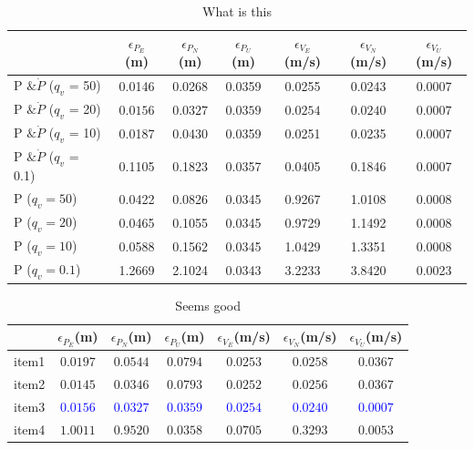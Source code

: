 \documentclass[paper=a4, fontsize=11pt]{scrartcl} %
\numberwithin{equation}{section} %
\numberwithin{figure}{section} %
\numberwithin{table}{section} %
\begin{document}
\begin{table}[!htbp]
  \centering
  \caption{What is this}\label{tab:Task2}
\begin{tabular}{|l|c|c|c|c|c|c|}
  \hline
   & $\epsilon_{P_E}$(m) & $\epsilon_{P_N}$(m) & $\epsilon_{P_U}$(m) & $\epsilon_{V_E}$(m/s) & $\epsilon_{V_N}$(m/s) & $\epsilon_{V_U}$(m/s) \\\hline
  P $\& \dot{P}$ ($q_v$ = 50)
  & 0.0146  &  0.0268  &  0.0359  &  0.0255   & 0.0243 &   0.0007 \\ %
  P $\& \dot{P}$ ($q_v$ = 20)
   &$\bm{0.0156}$   & $\bm{0.0327}$   &  $\bm{0.0359}$    & $\bm{0.0254}$   &  $\bm{0.0240}$    & $\bm{0.0007}$  \\%
  P $\& \dot{P}$ ($q_v$ = 10)
   & 0.0187  &  0.0430  &  0.0359  &  0.0251 &   0.0235  &  0.0007 \\%
  P $\& \dot{P}$ ($q_v$ = 0.1)
   & 0.1105 &   0.1823  &  0.0357  &  0.0405   & 0.1846  &  0.0007 \\\hline%
  P ($q_v = 50 $)
  & 0.0422  &  0.0826  &  0.0345   & 0.9267   & 1.0108  &  0.0008 \\ %
  P ($q_v = 20 $)
   &0.0465  &  0.1055  &  0.0345   & 0.9729  &  1.1492   & 0.0008 \\ %
  P ($q_v = 10 $)
   & 0.0588 &   0.1562  &  0.0345  &  1.0429  &  1.3351  &  0.0008 \\ %
  P ($q_v = 0.1 $)
   & 1.2669  &  2.1024 &   0.0343  &  3.2233  &  3.8420  &  0.0023  \\ %
  \hline
\end{tabular}
\end{table}


\begin{table}[!htbp]
  \centering
  \caption{Seems good}\label{tab:Task3}
\begin{tabular}{|l|c|c|c|c|c|c|}
  \hline
   & $\epsilon_{P_E}$(m) & $\epsilon_{P_N}$(m) & $\epsilon_{P_U}$(m) & $\epsilon_{V_E}$(m/s) & $\epsilon_{V_N}$(m/s) & $\epsilon_{V_U}$(m/s) \\\hline
  item1
   &$\bm{0.0197}$  &  $\bm{0.0544}$  & $\bm{ 0.0794} $  & $\bm{0.0253}$ &  $\bm{ 0.0258 } $& $\bm{ 0.0367}$ \\%
  item2
   & $\bm{0.0145}$  &  $\bm{0.0346}$    & $\bm{0.0793}$    & $\bm{0.0252}$  &   $\bm{0.0256}$  &   $\bm{0.0367}$ \\%
  {item3}
  &\textcolor{blue}{$\bm{0.0156}$}  & \textcolor{blue}{$\bm{0.0327}$}   &  \textcolor{blue}{$\bm{0.0359}$}    & \textcolor{blue}{$\bm{0.0254}$}   &  \textcolor{blue}{$\bm{0.0240}$}    & \textcolor{blue}{$\bm{0.0007}$} \\%
  item4
   & $\bm{1.0011}$  &  $\bm{0.9520}$  &  $\bm{0.0358}$   & $\bm{0.0705}$  &  $\bm{0.3293}$  &  $\bm{0.0053}$ \\%
  \hline
\end{tabular}
\end{table}
\end{document}
